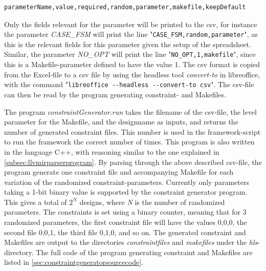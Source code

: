 \begin{verbatim}
parameterName,value,required,random,parameter,makefile,keepDefault
\end{verbatim}
Only the fields relevant for the parameter will be printed to the \gls{csv}, for instance the parameter \textit{CASE\_FSM} will print the line "\verb!CASE_FSM,random,parameter!", as this is the relevant fields for this parameter given the setup of the spreadsheet. Similar, the parameter \textit{NO\_OPT} will print the line "\verb!NO_OPT,1,makefile!", since this is a Makefile-parameter defined to have the value 1. The \gls{csv} format is copied from the Excel-file to a \gls{csv} file by using the headless tool \textit{convert-to} in libreoffice, with the command "\verb!libreoffice --headless --convert-to csv!". The \gls{csv}-file can then be read by the program generating constraint- and Makefiles. 

The program \textit{constraintGenerator.run} takes the filename of the \gls{csv}-file, the level parameter for the Makefile, and the designname as inputs, and returns the number of generated constraint files. This number is used in the framework-script to run the framework the correct number of times. This program is also written in the language C++, with reasoning similar to the one explained in \cref{subsec:llvmirparserprogram}. By parsing through the above described \gls{csv}-file, the program generate one constraint file and accompanying Makefile for each variation of the randomized constraint-parameters. Currently only parameters taking a 1-bit binary value is supported by the constraint generator program. This gives a total of $2^N$ designs, where \textit{N} is the number of randomized parameters. The constraints is set using a binary counter, meaning that for 3 randomized parameters, the first constraint file will have the values 0,0,0, the second file 0,0,1, the third file 0,1,0, and so on. The generated constraint and Makefiles are output to the directories \textit{constraintfiles} and \textit{makefiles} under the \textit{hls}-directory. The full code of the program generating constraint and Makefiles are listed in \cref{sec:constraintgeneratorsourcecode}.


